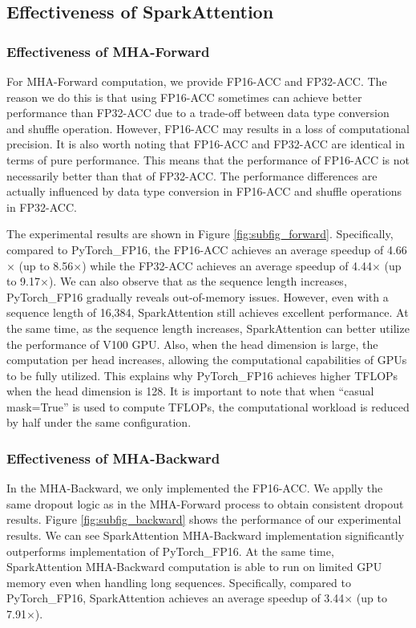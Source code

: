 \documentclass[10pt,twocolumn]{article}
\begin{document}
\subsection{Effectiveness of SparkAttention}

\subsubsection{Effectiveness of MHA-Forward} \label{sec:MHA-Forward_test}
For MHA-Forward computation, we provide FP16-ACC and FP32-ACC.
The reason we do this is that using FP16-ACC sometimes can achieve better performance than FP32-ACC due to a trade-off between data type conversion and shuffle operation.
However, FP16-ACC may results in a loss of computational precision.
It is also worth noting that FP16-ACC and FP32-ACC are identical in terms of pure performance. 
This means that the performance of FP16-ACC is not necessarily better than that of FP32-ACC. 
The performance differences are actually influenced by data type conversion in FP16-ACC and shuffle operations in FP32-ACC.

The experimental results are shown in Figure \ref{fig:subfig_forward}.
Specifically, compared to PyTorch\_FP16, the FP16-ACC achieves an average speedup of 4.66$\times$ (up to 8.56$\times$) while the FP32-ACC achieves an average speedup of 4.44$\times$ (up to 9.17$\times$).
We can also observe that as the sequence length increases, PyTorch\_FP16 gradually reveals out-of-memory issues.
However, even with a sequence length of 16,384, SparkAttention still achieves excellent performance.
At the same time, as the sequence length increases, SparkAttention can better utilize the performance of V100 GPU.
Also, when the head dimension is large, the computation per head increases, allowing the computational capabilities of GPUs to be fully utilized. 
This explains why PyTorch\_FP16 achieves higher TFLOPs when the head dimension is 128.
It is important to note that when “casual mask=True” is used to compute TFLOPs, the computational workload is reduced by half under the same configuration.


\subsubsection{Effectiveness of MHA-Backward}
In the MHA-Backward, we only implemented the FP16-ACC. 
We applly the same dropout logic as in the MHA-Forward process to obtain consistent dropout results.
Figure \ref{fig:subfig_backward} shows the performance of our experimental results. 
We can see SparkAttention MHA-Backward implementation significantly outperforms implementation of PyTorch\_FP16.
At the same time, SparkAttention MHA-Backward computation is able to run on limited GPU memory even when handling long sequences.
Specifically, compared to PyTorch\_FP16, SparkAttention achieves an average speedup of 3.44$\times$ (up to 7.91$\times$).
\end{document}
